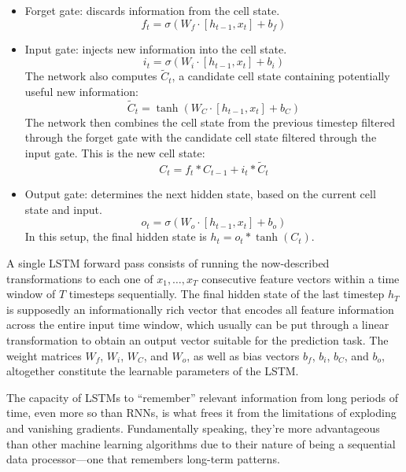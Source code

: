\documentclass[stu,floatsintext]{apa7}
\begin{document}
\begin{itemize}
\item Forget gate: discards information from the cell state. \begin{equation}f_t = \sigma(W_f \cdot [h_{t-1}, x_t] + b_f)\end{equation}
\item Input gate: injects new information into the cell state. \begin{equation}i_t = \sigma(W_i \cdot [h_{t-1}, x_t] + b_i)\end{equation}
The network also computes $\tilde{C}_t$, a candidate cell state containing potentially useful new information:
\begin{equation}\tilde{C}_t = \tanh(W_C \cdot [h_{t-1}, x_t] + b_C)\end{equation}
The network then combines the cell state from the previous timestep filtered through the forget gate with the candidate cell state filtered through the input gate. This is the new cell state:
\begin{equation}C_t = f_t * C_{t-1} + i_t * \tilde{C}_t\end{equation}
\item Output gate: determines the next hidden state, based on the current cell state and input. \begin{equation}o_t = \sigma(W_o \cdot [h_{t-1}, x_t] + b_o)\end{equation} In this setup, the final hidden state is $h_t = o_t * \tanh(C_t)$.
\end{itemize}

A single LSTM forward pass consists of running the now-described transformations to each one of $x_1,\dots,x_T$ consecutive feature vectors within a time window of $T$ timesteps sequentially. The final hidden state of the last timestep $h_T$ is supposedly an informationally rich vector that encodes all feature information across the entire input time window, which usually can be put through a linear transformation to obtain an output vector suitable for the prediction task. The weight matrices $W_f$, $W_i$, $W_C$, and $W_o$, as well as bias vectors $b_f$, $b_i$, $b_C$, and $b_o$, altogether constitute the learnable parameters of the LSTM.

The capacity of LSTMs to “remember” relevant information from long periods of time, even more so than RNNs, is what frees it from the limitations of exploding and vanishing gradients. Fundamentally speaking, they’re more advantageous than other machine learning algorithms due to their nature of being a sequential data processor—one that remembers long-term patterns.
\end{document}
